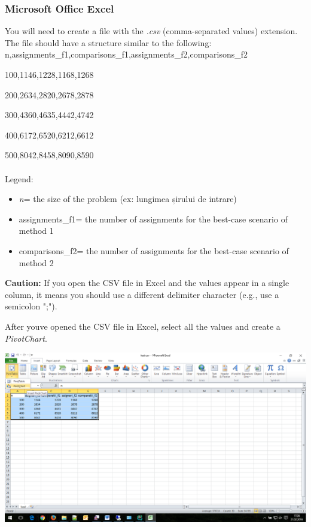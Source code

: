 \documentclass[../en-fa-lab.tex]{subfiles}
\begin{document}
\subsubsection{Microsoft Office Excel}\label{microsoft-office-excel}

You will need to create a file with the \emph{.csv} (comma-separated
values) extension. The file should have a structure similar to the
following:\\

n,assignments\_f1,comparisons\_f1,assignments\_f2,comparisons\_f2

100,1146,1228,1168,1268

200,2634,2820,2678,2878

300,4360,4635,4442,4742

400,6172,6520,6212,6612

500,8042,8458,8090,8590
\\\\
Legend:

\begin{itemize}
\item
  \emph{n}= the size of the problem (ex: lungimea șirului de intrare)
\item
  assignments\_f1= the number of assignments for the best-case scenario
  of method 1
\item
  comparisons\_f2= the number of assignments for the best-case scenario
  of method 2
\end{itemize}

\textbf{Caution:} If you open the CSV file in Excel and the values
appear in a single column, it means you should use a different delimiter
character (e.g., use a semicolon ";").

After you\textquotesingle ve opened the CSV file in Excel, select all
the values and create a \emph{PivotChart}.

\includegraphics[width=\textwidth]{../Resources/lab0/image11.png}
\end{document}

